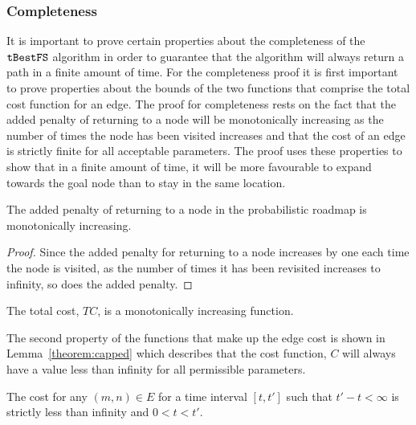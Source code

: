 \subsubsection{Completeness}

It is important to prove certain properties about the completeness of the
$\Acronym{tBestFS}$ algorithm in order to guarantee that the algorithm will
always return a path in a finite amount of time. For the completeness proof it
is first important to prove properties about the bounds of the two functions
that comprise the total cost function for an edge. The proof for completeness
rests on the fact that the added penalty of returning to a node will be
monotonically increasing as the number of times the node has been visited
increases and that the cost of an edge is strictly finite for all acceptable
parameters. The proof uses these properties to show that in a finite amount of
time, it will be more favourable to expand towards the goal node than to stay
in the same location.

\begin{lemma}

    \label{theorem:increasing}

    The added penalty of returning to a node in the probabilistic roadmap is
    monotonically increasing.

\end{lemma}

\begin{proof}

    Since the added penalty for returning to a node increases by one each time
    the node is visited, as the number of times it has been revisited increases
    to infinity, so does the added penalty.

\end{proof}

\begin{corollary}

    The total cost, $TC$, is a monotonically increasing function.

\end{corollary}

The second property of the functions that make up the edge cost is shown in
Lemma~\ref{theorem:capped} which describes that the cost function, $C$ will
always have a value less than infinity for all permissible parameters.

\begin{lemma}

    \label{theorem:capped}

    The cost for any $(m, n) \in E$ for a time interval $[t, t']$ such that $t'
    - t < \infty$ is strictly less than infinity and $0 < t < t'$.

\end{lemma}

